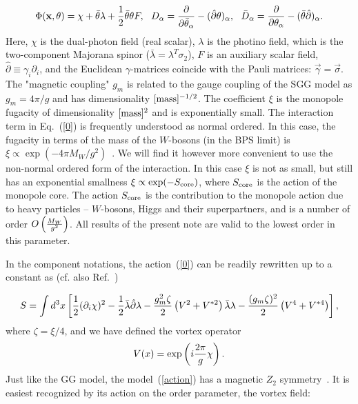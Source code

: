 \documentclass[a4paper,12pt]{article}
\begin{document}
\begin{equation}
\Phi({\bf x},\theta)=\chi+\bar\theta\lambda+\frac12\bar\theta\theta F,~~
D_\alpha=\frac{\partial}{\partial\bar\theta_\alpha}-(\hat\partial\theta)_\alpha,~~
\bar D_\alpha=\frac{\partial}{\partial\theta_\alpha}-(\bar\theta\hat\partial)_\alpha.
\end{equation}
Here, $\chi$ is the dual-photon field (real scalar), $\lambda$ is
the photino field, which is the two-component Majorana spinor
($\bar\lambda=\lambda^T\sigma_2$), $F$ is an auxiliary scalar
field, $\hat\partial\equiv\gamma_i\partial_i$, and the Euclidean
$\gamma$-matrices coincide with the Pauli matrices:
$\vec\gamma=\vec\sigma$. The "magnetic coupling" $g_m$ is related
to the gauge coupling of the SGG model as $g_{m}= 4\pi/g$ and has
dimensionality $[{\rm mass}]^{-1/2}$. The coefficient $\xi$ is the
monopole fugacity of dimensionality $[{\rm mass}]^{2}$ and is
exponentially small. The interaction term in Eq.~(\ref{0}) is
frequently understood as normal ordered. In this case, the
fugacity in terms of the mass of the $W$-bosons (in the BPS limit)
is $\xi\propto \exp\left(-4\pi M_W/g^2\right)$~\cite{1, ahw}. We
will find it however more convenient to use the non-normal ordered
form of the interaction. In this case $\xi$ is not as small, but
still has an exponential smallness $\xi\propto\exp(-S_{\rm
core})$, where $S_{\rm core}$ is the action of the monopole core.
The action $S_{\rm core}$ is the contribution to the monopole
action due to heavy particles -- $W$-bosons, Higgs and their
superpartners, and is a number of order $O\left({M_W\over
g^2}\right)$. All results of the present note are valid to the
lowest order in this parameter.

In the component notations, the action~(\ref{0}) can be readily
rewritten up to a constant as (cf. also Ref.~\cite{ahw})

\begin{equation}
S=\int
d^3x\left[\frac12(\partial_i\chi)^2-\frac{1}{2}\bar\lambda\hat\partial\lambda-
{g_m^2\zeta\over 2} \left(V^2+V^{*2}\right)\bar\lambda\lambda-
{(g_m\zeta)^2\over 2}\left(V^4+V^{*4}\right)\right],
\label{action}\end{equation}
where $\zeta=\xi/4$, and
we have defined the
vortex operator
\begin{equation}
V(x)=\exp\left(i{2\pi\over g}\chi\right).
\end{equation}
Just like the GG model, the model~(\ref{action}) has a magnetic $Z_2$ symmetry~\cite{2}.
It is easiest recognized by its action on the order
parameter, the vortex field:
\end{document}
